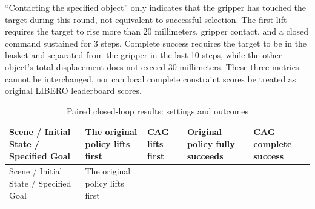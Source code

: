 
``Contacting the specified object'' only indicates that the gripper has touched the target during this round, not equivalent to successful selection. The first lift requires the target to rise more than 20 millimeters, gripper contact, and a closed command sustained for 3 steps. Complete success requires the target to be in the basket and separated from the gripper in the last 10 steps, while the other object's total displacement does not exceed 30 millimeters. These three metrics cannot be interchanged, nor can local complete constraint scores be treated as original LIBERO leaderboard scores.

\FloatBarrier\begingroup\small\setlength{\tabcolsep}{2.5pt}
\begin{longtable}[]{@{}
  >{\raggedright\arraybackslash}p{}
  >{\raggedright\arraybackslash}p{}
  >{\raggedright\arraybackslash}p{}
  >{\raggedright\arraybackslash}p{}
  >{\raggedright\arraybackslash}p{}@{}}
\caption{Paired closed-loop results: settings and outcomes}\label{tab:s14-5}\tabularnewline
\toprule\noalign{}
\begin{minipage}[b]{\linewidth}\raggedright
Scene / Initial State / Specified Goal
\end{minipage} & \begin{minipage}[b]{\linewidth}\raggedright
The original policy lifts first
\end{minipage} & \begin{minipage}[b]{\linewidth}\raggedright
CAG lifts first
\end{minipage} & \begin{minipage}[b]{\linewidth}\raggedright
Original policy fully succeeds
\end{minipage} & \begin{minipage}[b]{\linewidth}\raggedright
CAG complete success
\end{minipage} \\
\midrule\noalign{}
\endfirsthead
\toprule\noalign{}
\begin{minipage}[b]{\linewidth}\raggedright
Scene / Initial State / Specified Goal
\end{minipage} & \begin{minipage}[b]{\linewidth}\raggedright
The original policy lifts first

\end{minipage}
\end{longtable}
